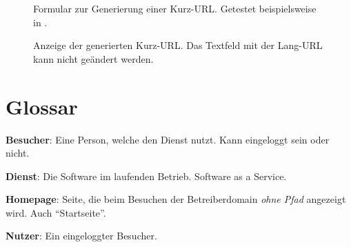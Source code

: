 \documentclass[parskip=full,11pt,twoside]{scrartcl}
\begin{document}
\begin{figure}[hb]
\caption{\label{fig:form}
Formular zur Generierung einer Kurz-URL.
Getestet beispielsweise in .
}
\end{figure}

\begin{figure}[hb]
\caption{\label{fig:generated}
Anzeige der generierten Kurz-URL.
Das Textfeld mit der Lang-URL kann nicht geändert werden.
}
\end{figure}

\section{Glossar}

\textbf{Besucher}:
Eine Person, welche den Dienst nutzt.
Kann eingeloggt sein oder nicht.

\textbf{Dienst}:
Die Software im laufenden Betrieb. Software as a Service.

\textbf{Homepage}:
Seite, die beim Besuchen der Betreiberdomain \emph{ohne Pfad} angezeigt wird. Auch \enquote{Startseite}.

\textbf{Nutzer}:
Ein eingeloggter Besucher.
\end{document}
